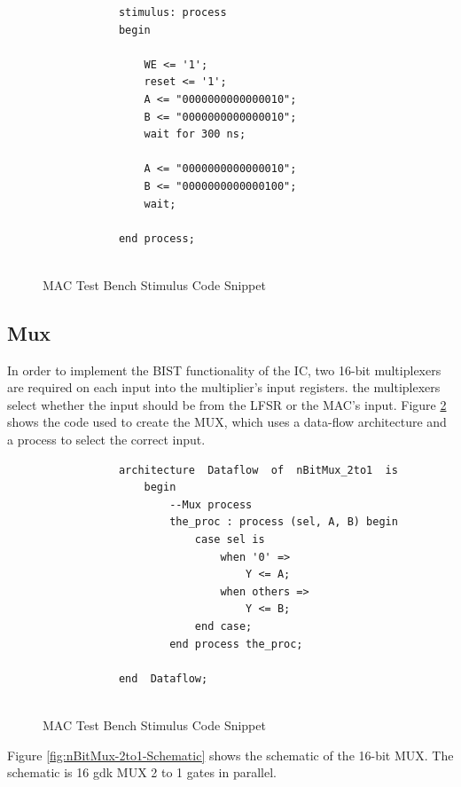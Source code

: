 \documentclass[11pt]{article}
\begin{document}
		\begin{figure}[H]
		\centering
		\begin{verbatim}
	        stimulus: process
	        begin
	
	            WE <= '1';
	            reset <= '1';
	            A <= "0000000000000010";
	            B <= "0000000000000010";
	            wait for 300 ns;
	            
	            A <= "0000000000000010";
	            B <= "0000000000000100";
	            wait;
	            
	        end process;
	
	        \end{verbatim}
	        \caption{MAC Test Bench Stimulus Code Snippet} 
	    	\label{code:MAC-tb} 
	    \end{figure}

	
	
	\subsection{Mux}
		In order to implement the BIST functionality of the IC, two 16-bit multiplexers are required on each input into the multiplier's input registers. the multiplexers select whether the input should be from the LFSR or the MAC's input. Figure \ref{code:MUX} shows the code used to create the MUX, which uses a data-flow architecture and a process to select the correct input.
		
		\begin{figure}[H]
		\centering
		\begin{verbatim}
	        architecture  Dataflow  of  nBitMux_2to1  is
	            begin
	                --Mux process
	                the_proc : process (sel, A, B) begin
	                    case sel is 
	                        when '0' =>
	                            Y <= A;
	                        when others =>
	                            Y <= B;
	                    end case;
	                end process the_proc;
	        
	        end  Dataflow;
	
     	\end{verbatim}
     	\caption{MAC Test Bench Stimulus Code Snippet} 
   		\label{code:MUX} 
	    \end{figure}
	    
	    Figure \ref{fig:nBitMux-2to1-Schematic} shows the schematic of the 16-bit MUX. The schematic is 16 gdk MUX 2 to 1 gates in parallel.
	
\end{document}
